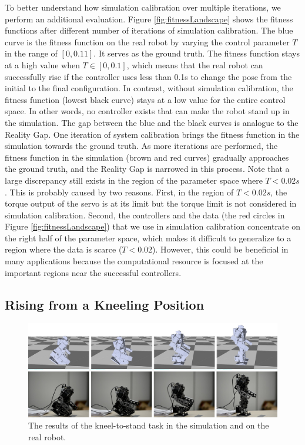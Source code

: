   To better understand how  simulation calibration  over multiple iterations, we perform an additional evaluation. Figure \ref{fig:fitnessLandscape} shows the fitness functions after different number of iterations of simulation calibration. The blue curve is the fitness function on the real robot by varying the control parameter $T$ in the range of $[0, 0.11]$. It serves as the ground truth. The fitness function stays at a high value when $T\in[0, 0.1]$, which means that the real robot can successfully rise if the controller uses less than 0.1s to change the pose from the initial to the final configuration. In contrast, without simulation calibration, the fitness function (lowest black curve) stays at a low value for the entire control space. In other words, no controller exists that can make the robot stand up in the simulation. The gap between the blue and the black curves is analogue to the Reality Gap. One iteration of system calibration brings the fitness function in the simulation towards the ground truth. As more iterations are performed, the fitness function in the simulation (brown and red curves) gradually approaches the ground truth, and the Reality Gap is narrowed in this process. Note that a large discrepancy still exists in the region of the parameter space where $T<0.02s$. This is probably caused by two reasons. First, in the region of $T<0.02s$, the torque output of the servo is at its limit but the torque limit is not considered in simulation calibration. Second, the controllers and the data (the red circles in Figure \ref{fig:fitnessLandscape}) that we use in simulation calibration concentrate on the right half of the parameter space, which makes it difficult to generalize to a region where the data is scarce ($T<0.02$). However, this could be beneficial in many applications because the computational resource is focused at the important regions near the successful controllers.

\subsection{Rising from a Kneeling Position}

\begin{figure}[!t]
  \centering
  \includegraphics[width=\textwidth]{figures/kneel2Stand}
  \caption{The results of the kneel-to-stand task in the simulation and on the real robot.}
  \label{fig:kneel2Stand}
\end{figure}

